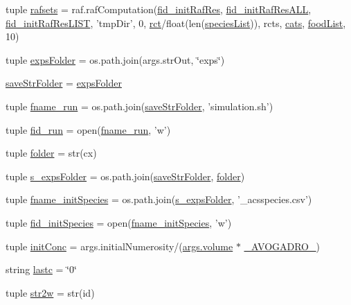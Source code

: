 \begin{DoxyCompactItemize}
\item 
tuple \hyperlink{a00126_a36370edf2a6a4e19f0a99413aac43096}{rafsets} = raf.\-raf\-Computation(\hyperlink{a00126_a2f9cfe05abfed3ab6326d0cb094c7c80}{fid\-\_\-init\-Raf\-Res}, \hyperlink{a00126_add1c3bb75f1d98889c27099fc14fc6a8}{fid\-\_\-init\-Raf\-Res\-A\-L\-L}, \hyperlink{a00126_a7af2668de12720f3c7925527002d81b0}{fid\-\_\-init\-Raf\-Res\-L\-I\-S\-T}, 'tmp\-Dir', 0, \hyperlink{a00126_a61159eb5aec77b97808ce3fb742d8f6d}{rct}/float(len(\hyperlink{a00126_aff8baae5d4cd1678204477dd5e620775}{species\-List})), rcts, \hyperlink{a00126_aea4d714ca7ceaba151380b3aed7c34d8}{cats}, \hyperlink{a00126_a878da371fd02e9515fe7305e0a57be09}{food\-List}, 10)
\item 
tuple \hyperlink{a00126_aa78205fca6ef215871776684bc141b26}{exps\-Folder} = os.\-path.\-join(args.\-str\-Out, \char`\"{}exps\char`\"{})
\item 
\hyperlink{a00126_adf74f9028f6a6e9a2de2046146a29ffe}{save\-Str\-Folder} = \hyperlink{a00126_aa78205fca6ef215871776684bc141b26}{exps\-Folder}
\item 
tuple \hyperlink{a00126_a58053e5bf5bd9f634c82e6fe7a330770}{fname\-\_\-run} = os.\-path.\-join(\hyperlink{a00126_adf74f9028f6a6e9a2de2046146a29ffe}{save\-Str\-Folder}, 'simulation.\-sh')
\item 
tuple \hyperlink{a00126_a107606e6132ad38bc8591a7931a277fc}{fid\-\_\-run} = open(\hyperlink{a00126_a58053e5bf5bd9f634c82e6fe7a330770}{fname\-\_\-run}, 'w')
\item 
tuple \hyperlink{a00126_a42c0d5f9f5131fc14ddb04d765cee15b}{folder} = str(cx)
\item 
tuple \hyperlink{a00126_ad8daa0d6fb501f0e422c7fb04e93c7cd}{s\-\_\-exps\-Folder} = os.\-path.\-join(\hyperlink{a00126_adf74f9028f6a6e9a2de2046146a29ffe}{save\-Str\-Folder}, \hyperlink{a00126_a42c0d5f9f5131fc14ddb04d765cee15b}{folder})
\item 
tuple \hyperlink{a00126_a6053e1a97cef2ed661333b2a7b0cf67e}{fname\-\_\-init\-Species} = os.\-path.\-join(\hyperlink{a00126_ad8daa0d6fb501f0e422c7fb04e93c7cd}{s\-\_\-exps\-Folder}, '\-\_\-acsspecies.\-csv')
\item 
tuple \hyperlink{a00126_aac88079820753d1e8c6628b7016a71d5}{fid\-\_\-init\-Species} = open(\hyperlink{a00126_a6053e1a97cef2ed661333b2a7b0cf67e}{fname\-\_\-init\-Species}, 'w')
\item 
tuple \hyperlink{a00126_a4fad8527bf8c9b7981003678aba3edff}{init\-Conc} = args.\-initial\-Numerosity/(\hyperlink{a00113_a9bc498ccac8db41438f855f5dd3f4c05}{args.\-volume} $\ast$ \hyperlink{a00126_abfe2f871ea28e48198cdd5799807de5b}{\-\_\-\-A\-V\-O\-G\-A\-D\-R\-O\-\_\-})
\item 
string \hyperlink{a00126_ae1f2c64eb13a9c020ffe6ec073883573}{lastc} = \char`\"{}0\char`\"{}
\item 
tuple \hyperlink{a00126_a015e630bcbd779acd7f68bf514793e0d}{str2w} = str(id)
\end{DoxyCompactItemize}


